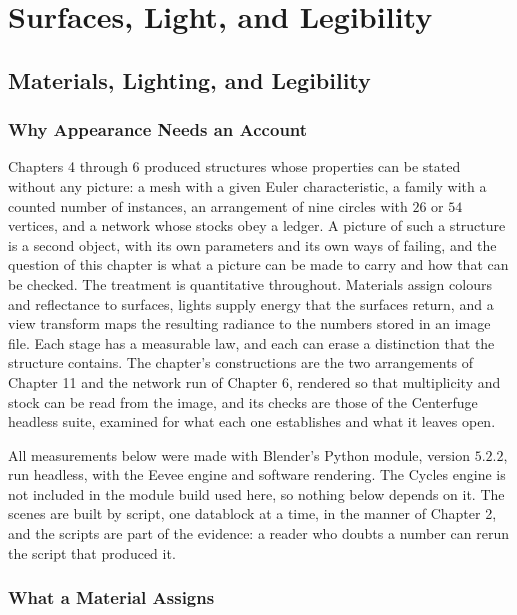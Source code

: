\part{Surfaces, Light, and Legibility}

\chapter{Materials, Lighting, and Legibility}

\section{Why Appearance Needs an Account}

Chapters 4 through 6 produced structures whose properties can be stated without any picture: a mesh with a given Euler characteristic, a family with a counted number of instances, an arrangement of nine circles with $26$ or $54$ vertices, and a network whose stocks obey a ledger. A picture of such a structure is a second object, with its own parameters and its own ways of failing, and the question of this chapter is what a picture can be made to carry and how that can be checked. The treatment is quantitative throughout. Materials assign colours and reflectance to surfaces, lights supply energy that the surfaces return, and a view transform maps the resulting radiance to the numbers stored in an image file. Each stage has a measurable law, and each can erase a distinction that the structure contains. The chapter's constructions are the two arrangements of Chapter 11 and the network run of Chapter 6, rendered so that multiplicity and stock can be read from the image, and its checks are those of the Centerfuge headless suite, examined for what each one establishes and what it leaves open.

All measurements below were made with Blender's Python module, version $5.2.2$, run headless, with the Eevee engine and software rendering. The Cycles engine is not included in the module build used here, so nothing below depends on it. The scenes are built by script, one datablock at a time, in the manner of Chapter 2, and the scripts are part of the evidence: a reader who doubts a number can rerun the script that produced it.

\section{What a Material Assigns}

